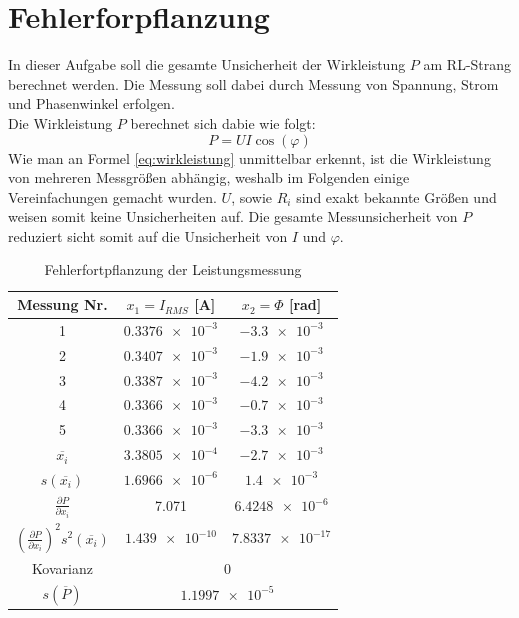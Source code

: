 \section{Fehlerforpflanzung}
In dieser Aufgabe soll die gesamte Unsicherheit der Wirkleistung $P$ am RL-Strang berechnet werden. Die Messung soll dabei durch Messung von Spannung, Strom und Phasenwinkel erfolgen. \\
Die Wirkleistung $P$ berechnet sich dabie wie folgt:
\begin{equation}
	P = UI\cos(\varphi)
	\label{eq:wirkleistung}
\end{equation}
Wie man an Formel \ref{eq:wirkleistung} unmittelbar erkennt, ist die Wirkleistung von mehreren Messgrößen abhängig, weshalb im Folgenden einige Vereinfachungen gemacht wurden. $U$, sowie $R_i$ sind exakt bekannte Größen und weisen somit keine Unsicherheiten auf. Die gesamte Messunsicherheit von $P$ reduziert sicht somit auf die Unsicherheit von $I$ und $\varphi$.
\begin{table}[h]
	\centering
	\begin{tabular}{|c||c|c|}
	\hline 
	Messung Nr. & $x_1 = I_{RMS}$ [A] & $x_2 = \Phi$ [rad] \\ 
	\hline 
	1 & $\num{0.3376e-3}$ &  $\num{-3.3e-3}$\\ 
	\hline 
	2 & $\num{0.3407e-3}$ & $\num{-1.9e-3}$ \\ 
	\hline 
	3 & $\num{0.3387e-3}$ & $\num{-4.2e-3}$ \\ 
	\hline 
	4 & $\num{0.3366e-3}$ & $\num{-0.7e-3}$ \\ 
	\hline 
	5 & $\num{0.3366e-3}$ & $\num{-3.3e-3}$\\ 
	\hline 
	\hline 
	$\overline{x_i}$ & $\num{3.3805e-4}$ & $\num{-2.7e-3}$ \\ 
	\hline 
	$s(\overline{x_i})$ & $\num{1.6966e-6}$ & $\num{1.4e-3}$ \\ 
	\hline 
	$\frac{\partial P}{\partial x_i}$ & 7.071 & $\num{6.4248e-6}$ \\ 
	\hline 
	$(\frac{\partial P}{\partial x_i})^2 s^2(\overline{x_i})$ & $\num{1.439e-10}$ & $\num{7.8337e-17}$ \\ 
	\hline 
	Kovarianz & \multicolumn{2}{c|}{0} \\ 
	\hline 
	$s (\overline{P})$ & \multicolumn{2}{c|}{$\num{1.1997e-5}$} \\ 
	\hline 
	\end{tabular} 
	\caption{Fehlerfortpflanzung der Leistungsmessung}
\end{table}
